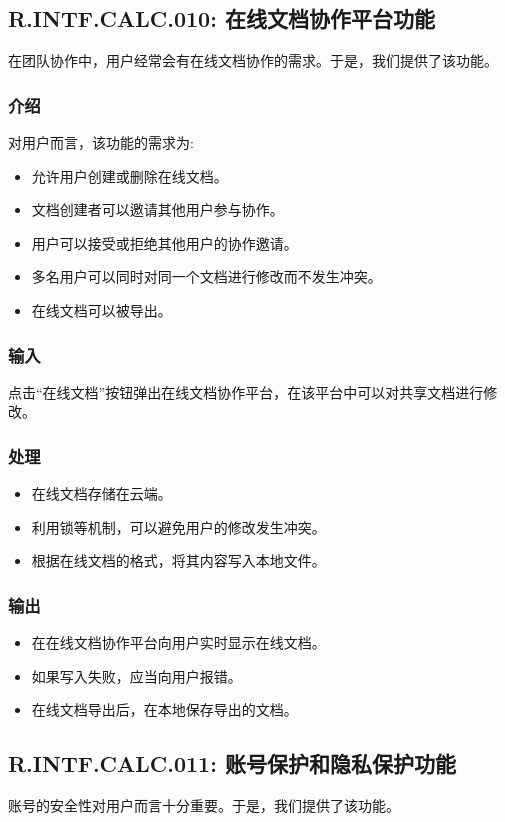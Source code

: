 \subsection{R.INTF.CALC.010: 在线文档协作平台功能}
在团队协作中，用户经常会有在线文档协作的需求。于是，我们提供了该功能。
\subsubsection{介绍}
对用户而言，该功能的需求为:
\begin{itemize}
  \item 允许用户创建或删除在线文档。
  \item 文档创建者可以邀请其他用户参与协作。
  \item 用户可以接受或拒绝其他用户的协作邀请。
  \item 多名用户可以同时对同一个文档进行修改而不发生冲突。
  \item 在线文档可以被导出。
\end{itemize}
\subsubsection{输入}
点击“在线文档”按钮弹出在线文档协作平台，在该平台中可以对共享文档进行修改。
\subsubsection{处理}
\begin{itemize}
  \item 在线文档存储在云端。
  \item 利用锁等机制，可以避免用户的修改发生冲突。
  \item 根据在线文档的格式，将其内容写入本地文件。
\end{itemize}
\subsubsection{输出}
\begin{itemize}
  \item 在在线文档协作平台向用户实时显示在线文档。
  \item 如果写入失败，应当向用户报错。
  \item 在线文档导出后，在本地保存导出的文档。
\end{itemize}

\subsection{R.INTF.CALC.011: 账号保护和隐私保护功能}
账号的安全性对用户而言十分重要。于是，我们提供了该功能。
